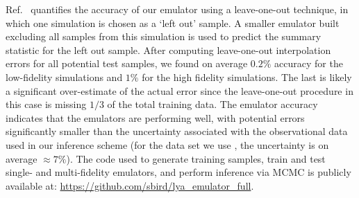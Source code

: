 \documentclass[a4paper,11pt]{article}
\begin{document}
Ref.~\cite{2023simsuite} quantifies the accuracy of our emulator using a leave-one-out technique, in which one simulation is chosen as a `left out' sample. A smaller emulator built excluding all samples from this simulation is used to predict the summary statistic for the left out sample. After computing leave-one-out interpolation errors for all potential test samples, we found on average $0.2\%$ accuracy for the low-fidelity simulations and $1\%$ for the high fidelity simulations. The last is likely a significant over-estimate of the actual error since the leave-one-out procedure in this case is missing $1/3$ of the total training data. The emulator accuracy indicates that the emulators are performing well, with potential errors significantly smaller than the uncertainty associated with the observational data used in our inference scheme (for the data set we use \cite{2019JCAP...07..017C}, the uncertainty is on average $\approx7\%$).
The code used to generate training samples, train and test single- and multi-fidelity emulators, and perform inference via MCMC is publicly available at: \url{https://github.com/sbird/lya_emulator_full}.
\end{document}
